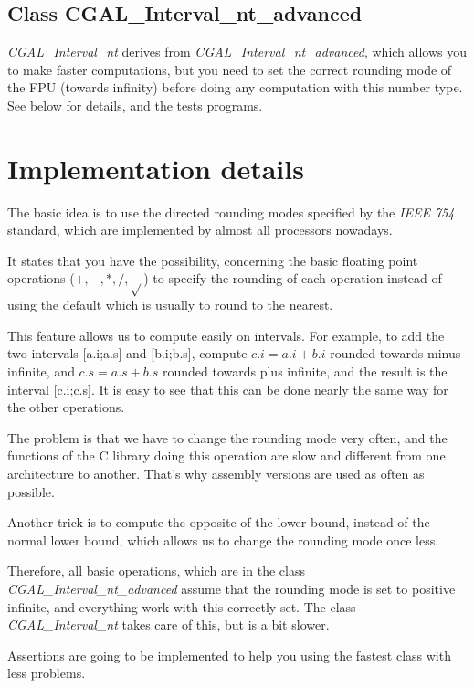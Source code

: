 \subsection {Class CGAL\_Interval\_nt\_advanced}

{\it CGAL\_Interval\_nt} derives from {\it CGAL\_Interval\_nt\_advanced},
which allows you to make faster computations, but you need to set the correct
rounding mode of the FPU (towards infinity) before doing any computation with
this number type.  See below for details, and the tests programs.


\section{Implementation details}

The basic idea is to use the directed rounding modes specified by the {\it
IEEE 754} standard, which are implemented by almost all processors nowadays.

It states that you have the possibility, concerning the basic floating point
operations ($+,-,*,/,\sqrt{}$) to specify the rounding of each operation
instead of using the default which is usually to round to the nearest.

This feature allows us to compute easily on intervals.  For example, to add the
two intervals [a.i;a.s] and [b.i;b.s], compute $c.i=a.i+b.i$ rounded towards
minus infinite, and $c.s=a.s+b.s$ rounded towards plus infinite, and the result
is the interval [c.i;c.s].  It is easy to see that this can be done nearly the
same way for the other operations.

\smallskip

The problem is that we have to change the rounding mode very often, and the
functions of the C library doing this operation are slow and different from
one architecture to another.  That's why assembly versions are used as often
as possible.

Another trick is to compute the opposite of the lower bound, instead of the
normal lower bound, which allows us to change the rounding mode once less.

Therefore, all basic operations, which are in the class {\it
CGAL\_Interval\_nt\_advanced} assume that the rounding mode is set to positive
infinite, and everything work with this correctly set.  The class {\it
CGAL\_Interval\_nt} takes care of this, but is a bit slower.

Assertions are going to be implemented to help you using the fastest class
with less problems.


